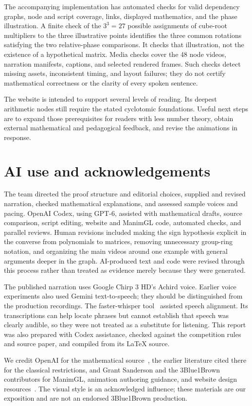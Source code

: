 \documentclass[11pt]{article}
\begin{document}
The accompanying implementation has automated checks for valid dependency
graphs, node and script coverage, links, displayed mathematics, and the
phase illustration. A finite check of the $3^{3}=27$ possible assignments
of cube-root multipliers to the three illustrative points identifies the
three common rotations satisfying the two relative-phase comparisons.
It checks that illustration, not the existence of a hypothetical matrix.
Media checks cover the 48 node videos, narration manifests, captions, and
selected rendered frames. Such checks detect missing assets, inconsistent
timing, and layout failures; they do not certify mathematical correctness
or the clarity of every spoken sentence.

The website is intended to support several levels of reading. Its deepest
arithmetic nodes still require the stated cyclotomic foundations. Useful
next steps are to expand those prerequisites for readers with less number
theory, obtain external mathematical and pedagogical feedback, and revise
the animations in response.

\section{AI use and acknowledgements}%
\label{sec:ai}

The team directed the proof structure and editorial choices, supplied and
revised narration, checked mathematical explanations, and assessed sample
voices and pacing. OpenAI Codex, using GPT-6, assisted with mathematical
drafts, source comparison, script editing, website and ManimGL code,
automated checks, and parallel reviews. Human revisions included making
the sign hypothesis explicit in the converse from polynomials to matrices, removing
unnecessary group-ring notation, and organizing the main videos around one
example with general arguments deeper in the graph. AI-produced text and
code were revised through this process rather than treated as evidence
merely because they were generated.

The published narration uses Google Chirp 3 HD's Achird voice. Earlier
voice experiments also used Gemini text-to-speech; they should be
distinguished from the production recordings. The faster-whisper tool~\cite{faster-whisper} assisted speech alignment. Its transcriptions can
help locate phrases but cannot establish that speech was clearly audible,
so they were not treated as a substitute for listening. This report was
also prepared with Codex assistance, checked against the competition
rules and source paper, and compiled from its \LaTeX{} source.

We credit OpenAI for the mathematical source~\cite{circulant-source},
the earlier literature cited there for the classical restrictions, and
Grant Sanderson and the 3Blue1Brown contributors for ManimGL, animation
authoring guidance, and website design resources~\cite{manimgl,threeblueonebrown-guidance,threeblueonebrown-site}. The visual style is
an acknowledged influence; these materials are our exposition and are
not an endorsed 3Blue1Brown production.

\begingroup
\raggedright{}


\endgroup
\end{document}
